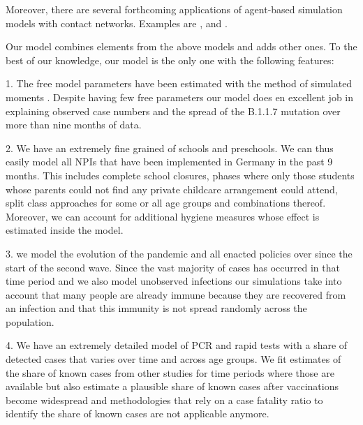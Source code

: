 Moreover, there are several forthcoming applications of agent-based simulation models with contact networks. Examples are
\citet{Basurto2020}, \citet{DelliGatti2020} and \citet{Mellacher2020}.

Our model combines elements from the above models and adds other ones. To the best of
our knowledge, our model is the only one with the following features:

1. The free model parameters have been estimated with the method of simulated moments
\citep{McFadden1989}. Despite having few free parameters our model does en excellent
job in explaining observed case numbers and the spread of the B.1.1.7 mutation over
more than nine months of data.

2. We have an extremely fine grained of schools and preschools.
We can thus easily model all NPIs that have been implemented in Germany in the past 9
months. This includes complete school closures, phases where only those students whose
parents could not find any private childcare arrangement could attend, split class
approaches for some or all age groups and combinations thereof. Moreover, we can
account for additional hygiene measures whose effect is estimated inside the model.

3. we model the evolution of the pandemic and all enacted policies over since the
start of the second wave. Since the vast majority of cases has occurred in that time
period and we also model unobserved infections our simulations take into account that
many people are already immune because they are recovered from an infection and that
this immunity is not spread randomly across the population.

4. We have an extremely detailed model of PCR and rapid tests with a share of detected
cases that varies over time and across age groups. We fit estimates of the share of
known cases from other studies for time periods where those are available but also
estimate a plausible share of known cases after vaccinations become widespread and
methodologies that rely on a case fatality ratio to identify the share of known
cases are not applicable anymore.


